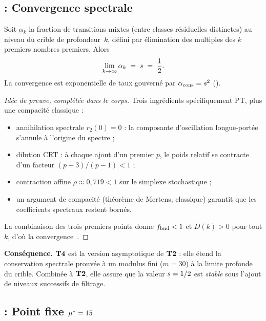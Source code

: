 \subsection{\Tfour{} : Convergence spectrale}
\label{sec:theoremes:T4}

\begin{theoreme}
\label{thm:T4}
Soit $\alpha_k$ la fraction de transitions mixtes (entre classes résiduelles distinctes) au niveau du crible de profondeur~$k$, défini par élimination des multiples des $k$ premiers nombres premiers. Alors
\[
\lim_{k \to \infty} \alpha_k \;=\; s \;=\; \frac{1}{2}.
\]
La convergence est exponentielle de taux gouverné par $\alpha_{\rm cons} = s^2$ (\Ttwo).
\end{theoreme}

\begin{proof}[Idée de preuve, complétée dans le corps]
Trois ingrédients spécifiquement PT, plus une compacité classique :
\begin{itemize}[nosep,leftmargin=*]
\item annihilation spectrale $r_2(0) = 0$ : la composante d'oscillation longue-portée s'annule à l'origine du spectre ;
\item dilution CRT : à chaque ajout d'un premier $p$, le poids relatif se contracte d'un facteur $(p-3)/(p-1) < 1$ ;
\item contraction affine $\rho \approx 0{,}719 < 1$ sur le simplexe stochastique ;
\item un argument de compacité (théorème de Mertens, classique) garantit que les coefficients spectraux restent bornés.
\end{itemize}
La combinaison des trois premiers points donne $f_{\rm bnd} < 1$ et $D(k) > 0$ pour tout $k$, d'où la convergence~\cite[ch.~07]{PT_Monograph}.
\end{proof}

\textbf{Conséquence.} $\textbf{T4}$ est la version asymptotique de $\textbf{T2}$ : elle étend la conservation spectrale prouvée à un modulus fini ($m=30$) à la limite profonde du crible. Combinée à $\textbf{T2}$, elle assure que la valeur $s = 1/2$ est \emph{stable} sous l'ajout de niveaux successifs de filtrage.

\subsection{\Tfive{} : Point fixe \texorpdfstring{$\mu^{*} = 15$}{μ*=15}}
\label{sec:theoremes:T5}

